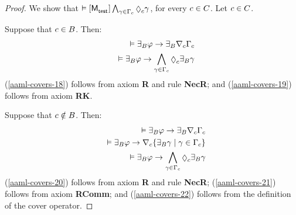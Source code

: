 \begin{proof}
We show that $\entails \actionA{\aPModel{\aStateTest}} \bigwedge_{\gamma \in \Gamma_\agentC} \possibleC \gamma$, for every $c \in C$.
Let $c \in C$.

Suppose that $c \in B$.
Then:
\begin{eqnarray}
    &&\entails \someactsBs \phi \implies \someactsBs \coversC \Gamma_\agentC \label{aaml-covers-18}\\
    &&\entails \someactsBs \phi \implies \bigwedge_{\gamma \in \Gamma_\agentC} \possibleC \someactsBs \gamma \label{aaml-covers-19}
\end{eqnarray}
(\ref{aaml-covers-18}) follows from \axiomAamlK{} axiom {\bf R} and rule {\bf NecR}; and
(\ref{aaml-covers-19}) follows from \axiomAamlK{} axiom {\bf RK}.

Suppose that $c \notin B$.
Then:
\begin{eqnarray}
    &&\entails \someactsBs \phi \implies \someactsBs \coversC \Gamma_\agentC \label{aaml-covers-20}\\
    &&\entails \someactsBs \phi \implies \coversC \{\someactsBs \gamma \mid \gamma \in \Gamma_\agentC \}\label{aaml-covers-21}\\
    &&\entails \someactsBs \phi \implies \bigwedge_{\gamma \in \Gamma_\agentC} \possibleC \someactsBs \gamma \label{aaml-covers-22}
\end{eqnarray}
(\ref{aaml-covers-20}) follows from \axiomAamlK{} axiom {\bf R} and rule {\bf NecR};
(\ref{aaml-covers-21}) follows from \axiomAamlK{} axiom {\bf RComm}; and
(\ref{aaml-covers-22}) follows from the definition of the cover operator.


\end{proof}
